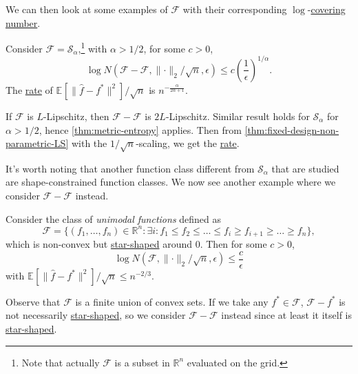 We can then look at some examples of \(\mathscr{F} \) with their corresponding \(\log \)-\hyperref[def:covering-number]{covering number}.

\begin{eg}
	Consider \(\mathscr{F} = \mathcal{S} _\alpha \),\footnote{Note that actually \(\mathscr{F} \) is a subset in \(\mathbb{R} ^n\) evaluated on the grid.} with \(\alpha > 1 / 2\), for some \(c > 0\),
	\[
		\log N(\mathscr{F} - \mathscr{F} , \lVert \cdot \rVert _2 / \sqrt{n} , \epsilon ) \leq c \left( \frac{1}{\epsilon } \right) ^{1 / \alpha }.
	\]
	The \hyperref[def:rate-of-convergence]{rate} of \(\mathbb{E}_{}[\lVert \hat{f} - f^{\ast} \rVert ^2 ] / \sqrt{n} \) is \(n^{- \frac{\alpha}{2\alpha + 1}}\).
\end{eg}
\begin{explanation}
	If \(\mathscr{F} \) is \(L\)-Lipschitz, then \(\mathscr{F} - \mathscr{F} \) is \(2L\)-Lipschitz. Similar result holds for \(\mathcal{S} _\alpha \) for \(\alpha > 1 / 2\), hence \autoref{thm:metric-entropy} applies. Then from \autoref{thm:fixed-design-non-parametric-LS} with the \(1 / \sqrt{n} \)-scaling, we get the \hyperref[def:rate-of-convergence]{rate}.
\end{explanation}

It's worth noting that another function class different from \(\mathcal{S} _\alpha \) that are studied are shape-constrained function classes. We now see another example where we consider \(\mathscr{F} - \mathscr{F} \) instead.

\begin{eg}
	Consider the class of \emph{unimodal functions} defined as
	\[
		\mathscr{F} = \{ (f_1, \dots , f_n) \in \mathbb{R} ^n \colon \exists i \colon f_1 \leq f_2 \leq \dots \leq f_i \geq f_{i+1} \geq \dots \geq f_n \},
	\]
	which is non-convex but \hyperref[def:star-shaped]{star-shaped} around \(0\). Then for some \(c > 0\),
	\[
		\log N(\mathscr{F} , \lVert \cdot \rVert _2 / \sqrt{n} , \epsilon ) \leq \frac{c}{\epsilon }
	\]
	with \(\mathbb{E}_{}[\lVert \hat{f} - f^{\ast}  \rVert ^2 ] / \sqrt{n} \leq n^{- 2 / 3}\).
\end{eg}
\begin{explanation}
	Observe that \(\mathscr{F} \) is a finite union of convex sets. If we take any \(f^{\ast} \in \mathscr{F} \), \(\mathscr{F} - f^{\ast} \) is not necessarily \hyperref[def:star-shaped]{star-shaped}, so we consider \(\mathscr{F} - \mathscr{F} \) instead since at least it itself is \hyperref[def:star-shaped]{star-shaped}.
\end{explanation}

